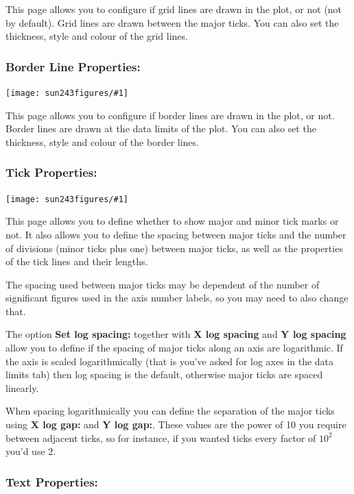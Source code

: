 \documentclass[twoside,11pt]{article}
\newcommand{\htmladdimg}[1]{}
\newcommand{\latexhtml}[2]{#1}
\renewcommand{\_}{\texttt{\symbol{95}}}
\newcommand{\mainfigure}[1]
{\begin{center}
 \latexhtml{\texttt{[image: sun243\_figures/\#1]}}{\htmladdimg{#1.gif}}
 \end{center}
}
\newcommand{\labelitem}[1]{\textbf{#1}}
\begin{document}
This page allows you to configure if grid lines are drawn in the plot,
or not (not by default). Grid lines are drawn between the major
ticks. You can also set the thickness, style and colour of the grid lines.

\newpage
\subsubsection*{Border Line Properties:}

\mainfigure{configurewindowborder}

This page allows you to configure if border lines are drawn in the plot,
or not. Border lines are drawn at the data limits of the plot. You can
also set the thickness, style and colour of the border lines.

\newpage
\subsubsection*{Tick Properties:}

\mainfigure{configurewindowticks}

This page allows you to define whether to show major and minor tick
marks or not. It also allows you to define the spacing between major
ticks and the number of divisions (minor ticks plus one) between major
ticks, as well as the properties of the tick lines and their lengths.

The spacing used between major ticks may be dependent of the number of
significant figures used in the axis number labels, so you may need to
also change that.

The option \labelitem{Set log spacing:} together with
\labelitem{X log spacing} and \labelitem{Y log spacing} allow you to define if
the spacing of major ticks along an axis are logarithmic. If the axis is
scaled logarithmically (that is you've asked for log axes in the data limits
tab) then log spacing is the default, otherwise major ticks are spaced
linearly.

When spacing logarithmically you can define the separation of the major ticks
using \labelitem{X log gap:} and \labelitem{Y log gap:}. These values are
the power of 10 you require between adjacent ticks, so for instance, if you
wanted ticks every factor of $10^2$ you'd use $2$.

\newpage
\subsubsection*{Text Properties:}
\end{document}
